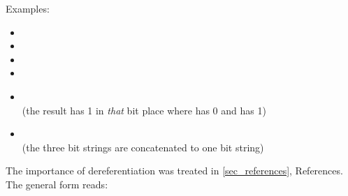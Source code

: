 Examples:

\begin{itemize}
\item {}
\item {}
\item {}
\item {}
\item {}\\
      (the result has 1 in {\it that} bit place where 
      has 0 and  has 1)
\item {}\\
      (the three bit strings are concatenated to one bit string)
\end{itemize}


The importance of dereferentiation was treated in
 \ref{sec_references}, References. The
general form reads:

